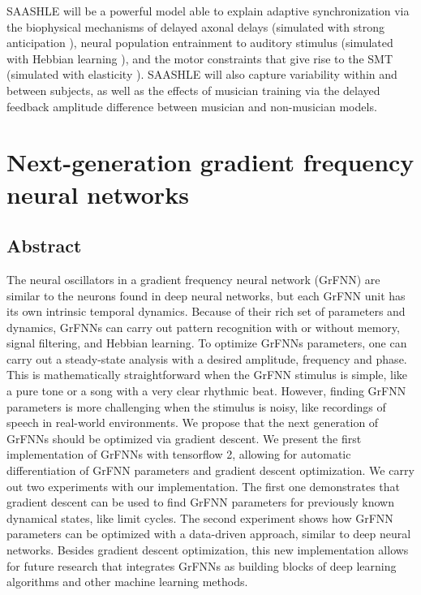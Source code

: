 \documentclass{report}
\begin{document}
SAASHLE will be a powerful model able to explain adaptive synchronization via the biophysical mechanisms of delayed axonal delays (simulated with strong anticipation \cite{stepp2010strong}), neural population entrainment to auditory stimulus (simulated with Hebbian learning \cite{righetti2006dynamic}), and the motor constraints that give rise to the SMT (simulated with elasticity \cite{lambert2016adaptive}). SAASHLE will also capture variability within and between subjects, as well as the effects of musician training via the delayed feedback amplitude difference between musician and non-musician models. 


\chapter{Next-generation gradient frequency neural networks}

\section{Abstract}
The neural oscillators in a gradient frequency neural network (GrFNN) are similar to the neurons found in deep neural networks, but each GrFNN unit has its own intrinsic temporal dynamics. Because of their rich set of parameters and dynamics, GrFNNs can carry out pattern recognition with or without memory, signal filtering, and Hebbian learning. To optimize GrFNNs parameters, one can carry out a steady-state analysis with a desired amplitude, frequency and phase. This is mathematically straightforward when the GrFNN stimulus is simple, like a pure tone or a song with a very clear rhythmic beat. However, finding GrFNN parameters is more challenging when the stimulus is noisy, like recordings of speech in real-world environments. We propose that the next generation of GrFNNs should be optimized via gradient descent. We present the first implementation of GrFNNs with tensorflow 2, allowing for automatic differentiation of GrFNN parameters and gradient descent optimization. We carry out two experiments with our implementation. The first one demonstrates that gradient descent can be used to find GrFNN parameters for previously known dynamical states, like limit cycles. The second experiment shows how GrFNN parameters can be optimized with a data-driven approach, similar to deep neural networks. Besides gradient descent optimization, this new implementation allows for future research that integrates GrFNNs as building blocks of deep learning algorithms and other machine learning methods.
\end{document}

